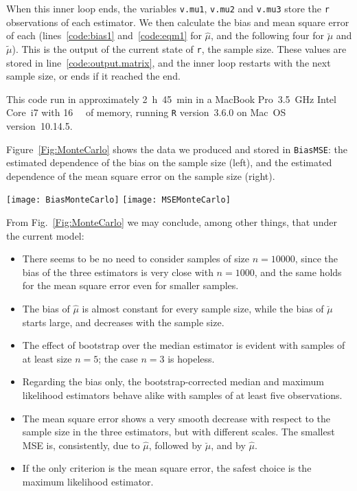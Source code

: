When this inner loop ends, the variables \verb|v.mu1|, \verb|v.mu2| and \verb|v.mu3| store the \verb|r| observations of each estimator.
We then calculate the bias and mean square error of each (lines~\ref{code:bias1} and~\ref{code:eqm1} for $\widehat{\mu}$, and the following four for $\breve{\mu}$ and $\widetilde{\mu}$).
This is the output of the current state of \verb|r|, the sample size.
These values are stored in line~\ref{code:output.matrix}, and the inner loop restarts with the next sample size, or ends if it reached the end.

This code run in approximately \SI{2}{\hour}~\SI{45}{\minute}
in a MacBook Pro~\SI{3.5}{\giga\hertz} Intel Core~i7 with \SI{16}{\giga\byte} of memory,
running \texttt R version~3.6.0 on Mac~OS version~10.14.5.

Figure~\ref{Fig:MonteCarlo} shows the data we produced and stored in \verb|BiasMSE|: the estimated dependence of the bias on the sample size (left), and the estimated dependence of the mean square error on the sample size (right).

\begin{figure*}
\centering
{\texttt{[image: BiasMonteCarlo]}}
{\texttt{[image: MSEMonteCarlo]}}
\caption{Bias and mean square error of $\widehat{\mu}$ (ML), $\breve{\mu}$ (Med), and $\widetilde{\mu}$ (BootMed).}\label{Fig:MonteCarlo}
\end{figure*}

From Fig.~\ref{Fig:MonteCarlo} we may conclude, among other things, that under the current model:
\begin{itemize}
\item There seems to be no need to consider samples of size $n=10000$, since the bias of the three estimators is very close with $n=1000$, and the same holds for the mean square error even for smaller samples.
\item The bias of $\widehat \mu$ is almost constant for every sample size, while the bias of $\breve{\mu}$ starts large, and decreases with the sample size.
\item The effect of bootstrap over the median estimator is evident with samples of at least size $n=5$; the case $n=3$ is hopeless.
\item[\NibSolidRight] Regarding the bias only, the bootstrap-corrected median and maximum likelihood estimators behave alike with samples of at least five observations.
\item The mean square error shows a very smooth decrease with respect to the sample size in the three estimators, but with different scales. The smallest MSE is, consistently, due to $\widehat{\mu}$, followed by $\breve{\mu}$, and by $\widehat{\mu}$.
\item[\NibSolidRight] If the only criterion is the mean square error, the safest choice is the maximum likelihood estimator.
\end{itemize}

